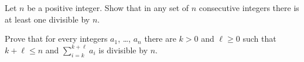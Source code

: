 \documentclass[addpoints]{exam}
\begin{document}
  \pagestyle{headandfoot}
  \runningheadrule

  \firstpagefooter{}{}{}
  \runningfooter{}{}{}
  \begin{flushright}

    \vspace{0.2in}
  \end{flushright}

  \begin{questions}
    \question[10]
      Let $n$ be a positive integer. Show that in any set of $n$ consecutive integers
			there is at least one divisible by $n$.

      \begin{solution}[\stretch{1}]
      \end{solution}
      \newpage
    \question
      Prove that for every integers $a_1$, \dots, $a_n$ there are
			$k > 0$ and $\ell \ge 0$ such that $k + \ell \le n$ and
			$\sum\limits_{i = k}^{k + \ell} a_i$ is divisible by $n$.

      \begin{solution}[\stretch{1}]
      \end{solution}
      \newpage
  \end{questions}
\end{document}
